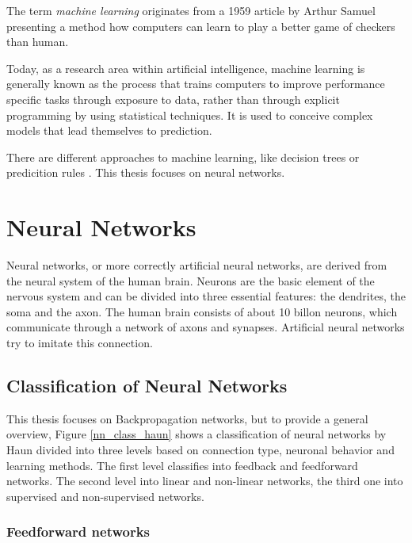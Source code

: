 The term \emph{machine learning} originates from a 1959 article by
Arthur Samuel \cite{Samuel59somestudies} presenting a method how
computers can learn to play a better game of checkers than human.

Today, as a research area within artificial intelligence, machine
learning is generally known as the process that trains computers to
improve performance specific tasks through exposure to data, rather than
through explicit programming by using statistical techniques. It is used
to conceive complex models that lead themselves to prediction.

There are different approaches to machine learning, like decision trees
or predicition rules \cite{michalski2013machine}. This thesis focuses on
neural networks.

\section{Neural Networks}\label{neural-networks}

Neural networks, or more correctly artificial neural networks, are
derived from the neural system of the human brain. Neurons are the basic
element of the nervous system and can be divided into three essential
features: the dendrites, the soma and the axon. The human brain consists
of about 10 billon neurons, which communicate through a network of axons
and synapses. Artificial neural networks try to imitate this connection.
\cite{haun1998simulation}

\subsection{Classification of Neural
Networks}\label{classification-of-neural-networks}

This thesis focuses on Backpropagation networks, but to provide a
general overview, Figure \ref{nn_class_haun} shows a classification of
neural networks by Haun \cite{haun1998simulation} divided into three
levels based on connection type, neuronal behavior and learning methods.
The first level classifies into feedback and feedforward networks. The
second level into linear and non-linear networks, the third one into
supervised and non-supervised networks.

\subsubsection{Feedforward networks}\label{feedforward-networks}

